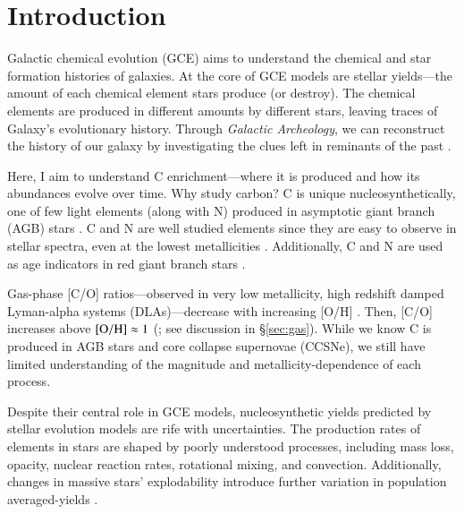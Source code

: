 \documentclass[12pt,oneside]{report}
\begin{document}

\tableofcontents
\listoffigures
\listoftables
\newpage
{}



\chapter{Introduction}

Galactic chemical evolution (GCE) aims to understand the chemical and star formation histories of galaxies. At the core of GCE models are stellar yields---the amount of each chemical element stars produce (or destroy). The chemical elements are produced in different amounts by different stars, leaving traces of Galaxy's evolutionary history. Through \textit{Galactic Archeology}, we can reconstruct the history of our galaxy by investigating the clues left in reminants of the past \citep{Weinberg+22, emily+19}.

Here, I aim to understand C enrichment---where it is produced and how its abundances evolve over time. Why study carbon? C is unique nucleosynthetically, one of few light elements (along with N) produced in asymptotic giant branch (AGB) stars \citep[e.g.][]{jennifer19, KL14}. C and N are well studied elements since they are easy to observe in stellar spectra, even at the lowest metallicities \cite[e.g.][]{fabbian+09, nissen+14, lambert81, laird85, lambert86}. Additionally, C and N are used as age indicators in red giant branch stars \citep{martig16, MG15, hasselquist19, vincenzo+21}.

Gas-phase [C/O] ratios---observed in very low metallicity, high redshift damped Lyman-alpha systems (DLAs)---decrease with increasing [O/H] \citep{FN15, cooke+17}. Then, [C/O] increases above $\rm [O/H] \approx 1$ (\citealt{berg+19}; see discussion in \S\ref{sec:gas}).
While we know C is produced in AGB stars and core collapse supernovae (CCSNe), we still have limited understanding of the magnitude and metallicity-dependence of each process.


Despite their central role in GCE models, nucleosynthetic yields predicted by stellar evolution models are rife with uncertainties. The production rates of elements in stars are shaped by poorly understood processes, including mass loss, opacity, nuclear reaction rates, rotational mixing, and convection\citep{KL14,ventura+13, LC18}.
Additionally, changes in massive stars' explodability introduce further variation in population averaged-yields \citep{emily+21}.
\end{document}
